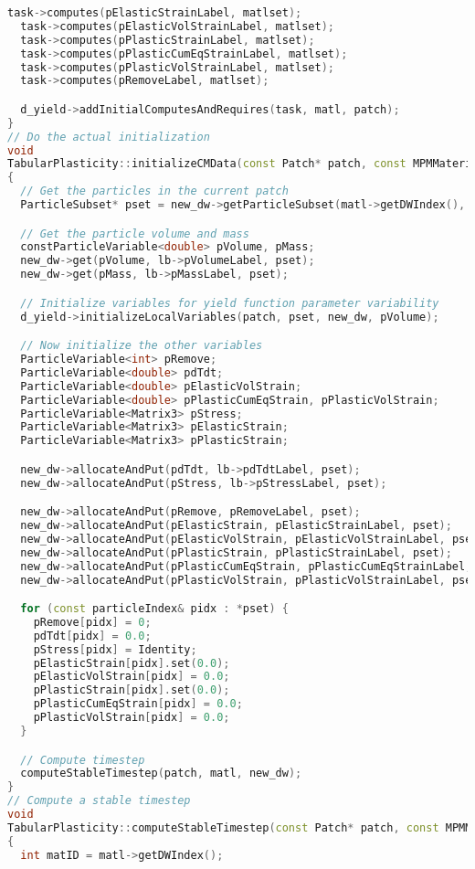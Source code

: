 \begin{enumerate}
\begin{lstlisting}[language=Cpp]
  task->computes(pElasticStrainLabel, matlset);
  task->computes(pElasticVolStrainLabel, matlset);
  task->computes(pPlasticStrainLabel, matlset);
  task->computes(pPlasticCumEqStrainLabel, matlset);
  task->computes(pPlasticVolStrainLabel, matlset);
  task->computes(pRemoveLabel, matlset);

  d_yield->addInitialComputesAndRequires(task, matl, patch);
}
// Do the actual initialization
void
TabularPlasticity::initializeCMData(const Patch* patch, const MPMMaterial* matl, DataWarehouse* new_dw)
{
  // Get the particles in the current patch
  ParticleSubset* pset = new_dw->getParticleSubset(matl->getDWIndex(), patch);

  // Get the particle volume and mass
  constParticleVariable<double> pVolume, pMass;
  new_dw->get(pVolume, lb->pVolumeLabel, pset);
  new_dw->get(pMass, lb->pMassLabel, pset);

  // Initialize variables for yield function parameter variability
  d_yield->initializeLocalVariables(patch, pset, new_dw, pVolume);

  // Now initialize the other variables
  ParticleVariable<int> pRemove;
  ParticleVariable<double> pdTdt;
  ParticleVariable<double> pElasticVolStrain;
  ParticleVariable<double> pPlasticCumEqStrain, pPlasticVolStrain;
  ParticleVariable<Matrix3> pStress;
  ParticleVariable<Matrix3> pElasticStrain;
  ParticleVariable<Matrix3> pPlasticStrain;

  new_dw->allocateAndPut(pdTdt, lb->pdTdtLabel, pset);
  new_dw->allocateAndPut(pStress, lb->pStressLabel, pset);

  new_dw->allocateAndPut(pRemove, pRemoveLabel, pset);
  new_dw->allocateAndPut(pElasticStrain, pElasticStrainLabel, pset);
  new_dw->allocateAndPut(pElasticVolStrain, pElasticVolStrainLabel, pset);
  new_dw->allocateAndPut(pPlasticStrain, pPlasticStrainLabel, pset);
  new_dw->allocateAndPut(pPlasticCumEqStrain, pPlasticCumEqStrainLabel, pset);
  new_dw->allocateAndPut(pPlasticVolStrain, pPlasticVolStrainLabel, pset);

  for (const particleIndex& pidx : *pset) {
    pRemove[pidx] = 0;
    pdTdt[pidx] = 0.0;
    pStress[pidx] = Identity;
    pElasticStrain[pidx].set(0.0);
    pElasticVolStrain[pidx] = 0.0;
    pPlasticStrain[pidx].set(0.0);
    pPlasticCumEqStrain[pidx] = 0.0;
    pPlasticVolStrain[pidx] = 0.0;
  }

  // Compute timestep
  computeStableTimestep(patch, matl, new_dw);
}
// Compute a stable timestep
void
TabularPlasticity::computeStableTimestep(const Patch* patch, const MPMMaterial* matl, DataWarehouse* new_dw)
{
  int matID = matl->getDWIndex();


\end{lstlisting}
\end{enumerate}
